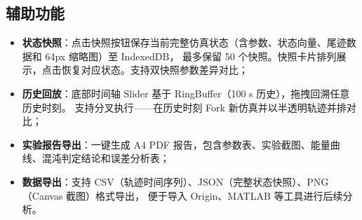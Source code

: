 \subsection{辅助功能}

\begin{itemize}
  \item \textbf{状态快照}：点击快照按钮保存当前完整仿真状态（含参数、状态向量、尾迹数据和 64px 缩略图）至 IndexedDB，
       最多保留 50 个快照。快照卡片排列展示，点击恢复对应状态。支持双快照参数差异对比；
  \item \textbf{历史回放}：底部时间轴 Slider 基于 RingBuffer（100 s 历史），拖拽回溯任意历史时刻。
       支持分叉执行——在历史时刻 Fork 新仿真并以半透明轨迹并排对比；
  \item \textbf{实验报告导出}：一键生成 A4 PDF 报告，包含参数表、实验截图、能量曲线、混沌判定结论和误差分析表；
  \item \textbf{数据导出}：支持 CSV（轨迹时间序列）、JSON（完整状态快照）、PNG（Canvas 截图）格式导出，
       便于导入 Origin、MATLAB 等工具进行后续分析。
\end{itemize}

\endinput
